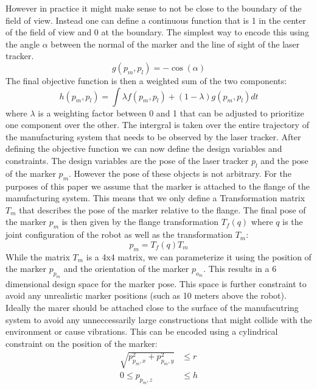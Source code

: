 \documentclass{svproc}
\begin{document}
However in practice it might make sense to not be close to the boundary of the field of view.
Instead one can define a continuous function that is 1 in the center of the field of view and 0 at the boundary.
The simplest way to encode this using the angle $\alpha$ between the normal of the marker and the line of sight of the laser tracker.
\begin{equation}
    g(p_m,p_l) = -\cos(\alpha)
\end{equation}
The final objective function is then a weighted sum of the two components:
\begin{equation}
    h(p_m,p_l) = \int \lambda f(p_m,p_l) + (1-\lambda) g(p_m,p_l) dt
    \label{eq:objective}
\end{equation}
where $\lambda$ is a weighting factor between 0 and 1 that can be adjusted to prioritize one component over the other.
The intergral is taken over the entire trajectory of the manufacturing system that needs to be observed by the laser tracker.
After defining the objective function we can now define the design variables and constraints.
The design variables are the pose of the laser tracker $p_l$ and the pose of the marker $p_m$.
However the pose of these objects is not arbitrary.
For the purposes of this paper we assume that the marker is attached to the flange of the manufacturing system.
This means that we only define a Transformation matrix $T_{m}$ that describes the pose of the marker relative to the flange.
The final pose of the marker $p_m$ is then given by the flange transformation $T_{f}(q)$ where $q$ is the joint configuration of the robot as well as the transformation $T_{m}$:
\begin{equation}
    p_m = T_{f}(q)T_{m}
\end{equation}
While the matrix $T_m$ is a 4x4 matrix, we can parameterize it using the position of the marker $p_{p_m}$ and the orientation of the marker $p_{o_m}$.
This results in a 6 dimensional design space for the marker pose.
This space is further constraint to avoid any unrealistic marker positions (such as 10 meters above the robot).
Ideally the marer should be attached close to the surface of the manufacutring system to avoid any unneccessarily large constructions that might collide with the environment or cause vibrations.
This can be encoded using a cylindrical constraint on the position of the marker:
\begin{equation}
        \begin{split}
    \sqrt{p_{p_m,x}^2 + p_{p_m,y}^2} &\leq r \\
        0 \leq p_{p_m,z} &\leq h
        \end{split}
\end{equation}
\end{document}
